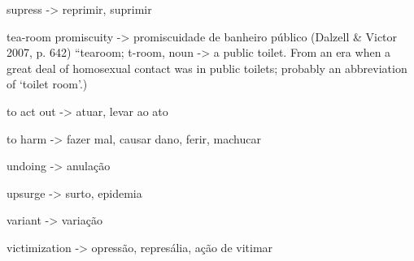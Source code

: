 \smallskip

\noindent supress -> reprimir, suprimir

\smallskip

\noindent tea-room  promiscuity -> promiscuidade de banheiro público
(Dalzell \& Victor 2007, p. 642) ``tearoom; t-room,
noun -> a public toilet. From an era when a great deal of
homosexual contact was in public toilets; probably an abbreviation of
`toilet room'.)

\smallskip

\noindent to act out -> atuar, levar ao ato

\smallskip

\noindent to harm -> fazer mal, causar dano, ferir, machucar

\smallskip

\noindent undoing -> anulação

\smallskip

\noindent upsurge -> surto, epidemia

\smallskip

\noindent variant -> variação

\smallskip

\noindent victimization -> opressão, represália, ação de vitimar

\cleardoublepage

